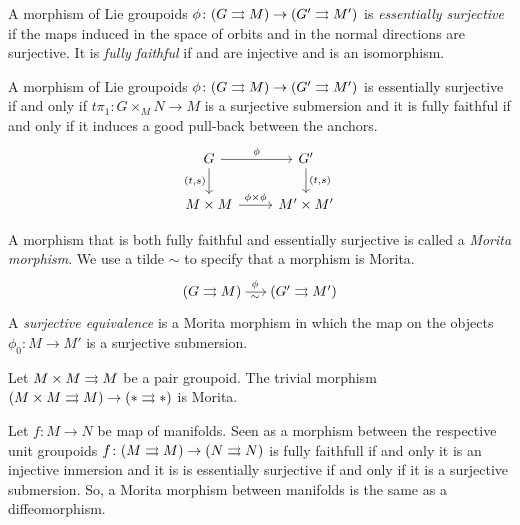 %
%

A morphism of Lie groupoids $\phi\colon(G\rightrightarrows M)\to(G'\rightrightarrows M')$ is \emph{essentially surjective} if the maps induced in the space of orbits  and in the normal directions  are surjective.
%
It is \emph{fully faithful} if  and  are injective and  is an isomorphism.

\begin{prop}\label{prop:dhfgpds}
A morphism of Lie groupoids $\phi\colon(G\rightrightarrows M)\to(G'\rightrightarrows M')$ is essentially surjective if and only if $t\pi_1\colon G\times_M N\to M$ is a surjective submersion and it is fully faithful if and only if it induces a good pull-back between the anchors.
\begin{equation}
\begin{tikzcd}
 G \ar{r}{\phi} \ar{d}[swap]{(t, s)} & G' \ar{d}{(t, s)} \\
 M\times M \ar{r}{\phi\times\phi} & M'\times M'
\end{tikzcd}
\end{equation}
\end{prop}

A morphism that is both fully faithful and essentially surjective is called a \emph{Morita morphism}.
We use a tilde $\sim$ to specify that a morphism is Morita.
\[ \begin{tikzcd}[sep = small]
 (G\tto M) \ar[shorten = -.15em]{r}[pos=.45, sloped, below]{\sim}[pos=.45, sloped, above]{\phi} & (G'\tto M')
\end{tikzcd} \]
%
A \emph{surjective equivalence} is a Morita morphism in which the map on the objects $\phi_0\colon M\to M'$ is a surjective submersion.


\begin{example}
Let $M\times M\rightrightarrows M$ be a pair groupoid.
The trivial morphism $(M\times M\rightrightarrows M) \to (*\rightrightarrows *)$ is Morita.
\end{example}

\begin{example}
Let $f\colon M\to N$ be map of manifolds.
Seen as a morphism between the respective unit groupoids $f\colon (M\rightrightarrows M) \to (N\rightrightarrows N)$ is fully faithfull if and only it is an injective inmersion and it is is essentially surjective if and only if it is a surjective submersion.
So, a Morita morphism between manifolds is the same as a diffeomorphism.
\end{example}

